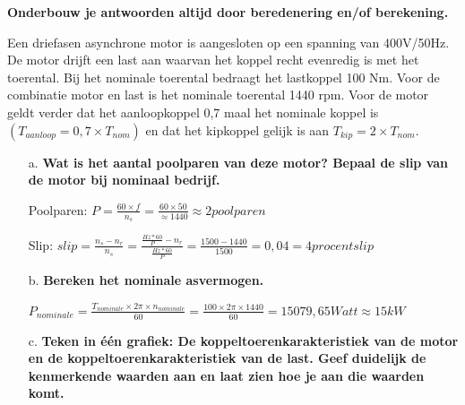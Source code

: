 \textbf{Onderbouw je antwoorden altijd door beredenering en/of berekening.}

Een driefasen asynchrone motor is aangesloten op een spanning van 400V/50Hz.
De motor drijft een last aan waarvan het koppel recht evenredig is met het toerental.
Bij het nominale toerental bedraagt het lastkoppel 100 Nm.
Voor de combinatie motor en last is het nominale toerental 1440 rpm.
Voor de motor geldt verder dat het aanloopkoppel 0,7 maal het nominale koppel is
$(T_{aanloop} = 0,7 \times T_{nom})$ en dat het kipkoppel gelijk is aan $T_{kip} = 2 \times T_{nom}$.

\begin{enumerate}
    \item [a.] \textbf{Wat is het aantal poolparen van deze motor? Bepaal de slip van de motor bij nominaal bedrijf.}
    
        Poolparen:
        $ P = \frac{60 \times f}{n_{s}} = \frac{60 \times 50}{\approx1440} \approx 2 poolparen $

        Slip:
        $slip 
        = \frac{n_{s} - n_{r}}{n_{s}} 
        = \frac{\frac{Hz*60}{P} - n_{r}}{\frac{Hz*60}{P}}
        = \frac{1500 - 1440}{1500}  
        = 0,04
        = 4 procent slip $

    \item [b.] \textbf{Bereken het nominale asvermogen.}

    $P_{nominale} 
    = \frac{T_{nominale} \times 2\pi \times n_{nominale}}{60}= \frac{100 \times 2\pi \times 1440}{60} 
    = 15079,65 Watt \approx 15 kW$


    \item [c.] \textbf{Teken in één grafiek: De koppeltoerenkarakteristiek van de motor en de koppeltoerenkarakteristiek van de last. Geef duidelijk de kenmerkende waarden aan en laat zien hoe je aan die waarden komt.}


\end{enumerate}
